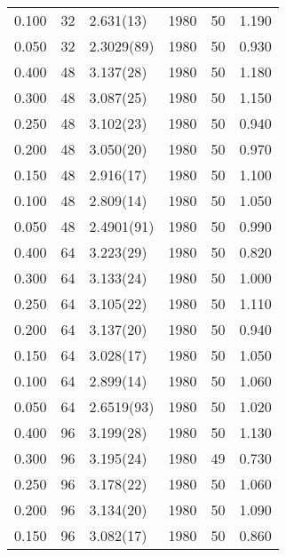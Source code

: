 \begin{tabular}{rrlrrr}
 0.100 &      32 & 2.631(13)  &                1980 &                  50 &    1.190 \\
 0.050 &      32 & 2.3029(89) &                1980 &                  50 &    0.930 \\
 0.400 &      48 & 3.137(28)  &                1980 &                  50 &    1.180 \\
 0.300 &      48 & 3.087(25)  &                1980 &                  50 &    1.150 \\
 0.250 &      48 & 3.102(23)  &                1980 &                  50 &    0.940 \\
 0.200 &      48 & 3.050(20)  &                1980 &                  50 &    0.970 \\
 0.150 &      48 & 2.916(17)  &                1980 &                  50 &    1.100 \\
 0.100 &      48 & 2.809(14)  &                1980 &                  50 &    1.050 \\
 0.050 &      48 & 2.4901(91) &                1980 &                  50 &    0.990 \\
 0.400 &      64 & 3.223(29)  &                1980 &                  50 &    0.820 \\
 0.300 &      64 & 3.133(24)  &                1980 &                  50 &    1.000 \\
 0.250 &      64 & 3.105(22)  &                1980 &                  50 &    1.110 \\
 0.200 &      64 & 3.137(20)  &                1980 &                  50 &    0.940 \\
 0.150 &      64 & 3.028(17)  &                1980 &                  50 &    1.050 \\
 0.100 &      64 & 2.899(14)  &                1980 &                  50 &    1.060 \\
 0.050 &      64 & 2.6519(93) &                1980 &                  50 &    1.020 \\
 0.400 &      96 & 3.199(28)  &                1980 &                  50 &    1.130 \\
 0.300 &      96 & 3.195(24)  &                1980 &                  49 &    0.730 \\
 0.250 &      96 & 3.178(22)  &                1980 &                  50 &    1.060 \\
 0.200 &      96 & 3.134(20)  &                1980 &                  50 &    1.090 \\
 0.150 &      96 & 3.082(17)  &                1980 &                  50 &    0.860 \\

\end{tabular}
